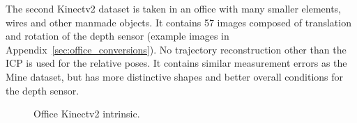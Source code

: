 The second Kinectv2 dataset is taken in an office with many smaller elements, wires and other manmade objects.
It contains 57 images composed of translation and rotation of the depth sensor (example images in Appendix~\ref{sec:office_conversions}).
No trajectory reconstruction other than the ICP is used for the relative poses.
It contains similar measurement errors as the Mine dataset, but has more distinctive shapes and better overall conditions for the depth sensor.
\begin{figure}[H]
\CenterFloatBoxes%
\begin{floatrow}
    {\caption{Office Kinectv2 intrinsic.}\label{tab:office_intrinsic}}%
\end{floatrow}
\end{figure}
